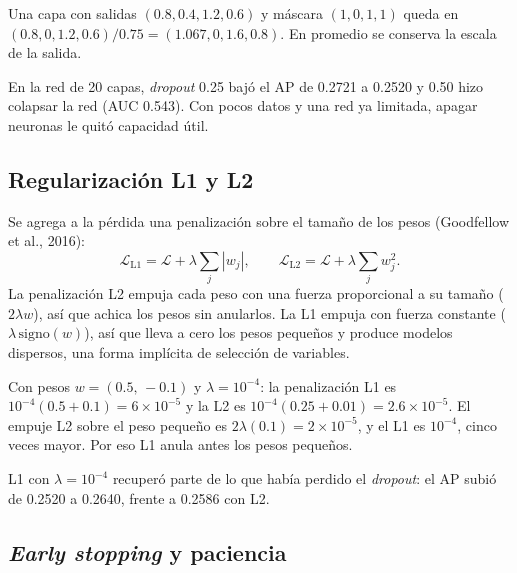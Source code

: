 \documentclass[11pt,a4paper]{article}
\begin{document}
\begin{ejemplo}[: dropout con $p=0.25$]
Una capa con salidas $(0.8, 0.4, 1.2, 0.6)$ y máscara $(1,0,1,1)$ queda en $(0.8,0,1.2,0.6)/0.75=(1.067,0,1.6,0.8)$. En promedio se conserva la escala de la salida.
\end{ejemplo}

\begin{proyecto}
En la red de 20 capas, \textit{dropout} 0.25 bajó el AP de 0.2721 a 0.2520 y 0.50 hizo colapsar la red (AUC 0.543). Con pocos datos y una red ya limitada, apagar neuronas le quitó capacidad útil.
\end{proyecto}

\subsection{Regularización L1 y L2}

Se agrega a la pérdida una penalización sobre el tamaño de los pesos (Goodfellow et al., 2016):
\begin{equation}
\mathcal{L}_{\text{L1}} = \mathcal{L} + \lambda\sum_j|w_j|, \qquad
\mathcal{L}_{\text{L2}} = \mathcal{L} + \lambda\sum_j w_j^2 .
\end{equation}
La penalización L2 empuja cada peso con una fuerza proporcional a su tamaño ($2\lambda w$), así que achica los pesos sin anularlos. La L1 empuja con fuerza constante ($\lambda\,\text{signo}(w)$), así que lleva a cero los pesos pequeños y produce modelos dispersos, una forma implícita de selección de variables.

\begin{ejemplo}[: L1 frente a L2]
Con pesos $w=(0.5,\,-0.1)$ y $\lambda=10^{-4}$: la penalización L1 es $10^{-4}(0.5+0.1)=6\times10^{-5}$ y la L2 es $10^{-4}(0.25+0.01)=2.6\times10^{-5}$. El empuje L2 sobre el peso pequeño es $2\lambda(0.1)=2\times10^{-5}$, y el L1 es $10^{-4}$, cinco veces mayor. Por eso L1 anula antes los pesos pequeños.
\end{ejemplo}

\begin{proyecto}
L1 con $\lambda=10^{-4}$ recuperó parte de lo que había perdido el \textit{dropout}: el AP subió de 0.2520 a 0.2640, frente a 0.2586 con L2.
\end{proyecto}

\subsection{\textit{Early stopping} y paciencia}\label{sec:es}
\end{document}
